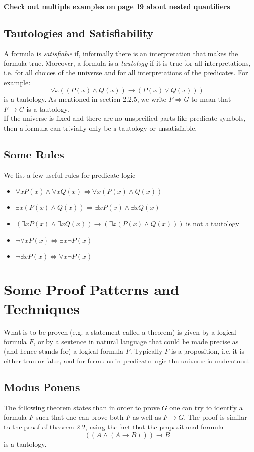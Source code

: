 \documentclass[a4paper]{report}
\begin{document}
\noindent\textbf{Check out multiple examples on page 19 about nested quantifiers}

\subsection{Tautologies and Satisfiability}
A formula is \emph{satisfiable} if, informally there is an interpretation that makes the formula true. Moreover, a formula is a \emph{tautology} if it is true for all interpretations, i.e. for all choices of the universe and for all interpretations of the predicates. For example:
\[\forall x ((P(x)\land Q(x))\to (P(x)\lor Q(x)))\]
is a tautology. As mentioned in section 2.2.5, we write $F\Longrightarrow G$ to mean that $F\to G$ is a tautology.\\

If the universe is fixed and there are no unspecified parts like predicate symbols, then a formula can trivially only be a tautology or unsatisfiable. 

\subsection{Some Rules}
We list a few useful rules for predicate logic
\begin{itemize}
\item $\forall x P(x)\land\forall x Q(x)\Longleftrightarrow \forall x(P(x)\land Q(x))$
\item $\exists x(P(x)\land Q(x))\Longrightarrow \exists x P(x)\land \exists x Q(x)$
\item $(\exists x P(x)\land \exists x Q(x))\to (\exists x(P(x)\land Q(x)))$ is not a tautology
\item $\lnot\forall xP(x)\Longleftrightarrow\exists x\lnot P(x)$
\item $\lnot\exists xP(x)\Longleftrightarrow\forall x\lnot P(x)$
\end{itemize}

\section{Some Proof Patterns and Techniques}
What is to be proven (e.g. a statement called a theorem) is given by a logical formula $F$, or by a sentence in natural language that could be made precise as (and hence stands for) a logical formula $F$. Typically $F$ is a proposition, i.e. it is either true or false, and for formulas in predicate logic the universe is understood. 
\subsection{Modus Ponens}
The following theorem states than in order to prove $G$ one can try to identify a formula $F$ such that one can prove both $F$ as well as $F\to G$. The proof is similar to the proof of theorem 2.2, using the fact that the propositional formula 
\[\left((A\land (A\to B)) \right)\to B\]
is a tautology. 
\end{document}
